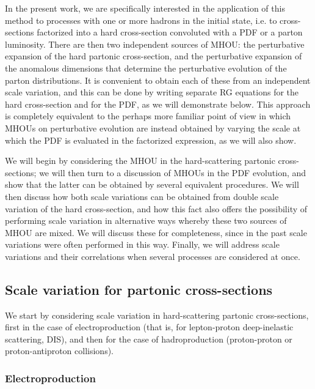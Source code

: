 In the present work, we are specifically interested in the application of this
method to processes
with one or more hadrons in the initial state, i.e. to
cross-sections factorized into a  hard
cross-section convoluted with a PDF or a parton luminosity.
%
There are then two independent sources of MHOU: the perturbative
expansion of the hard partonic cross-section, and the perturbative expansion of
the anomalous dimensions that determine the perturbative evolution of the
parton distributions.
%
It is convenient to obtain each of these from an independent scale
variation, and this can be done by writing separate RG
equations for the hard cross-section and for the PDF, as we will
demonstrate below.
%
This approach is completely equivalent to the perhaps more familiar point
of view in which MHOUs on perturbative evolution are instead obtained
by varying the scale at which the PDF is evaluated in the factorized
expression, as we will also show.

We will begin
by considering the MHOU in the hard-scattering
partonic cross-sections; we will then turn to a discussion of
MHOUs in the PDF evolution, and show that the latter can be obtained
by several equivalent procedures.
%
We will then discuss how both scale variations can be obtained
from double scale variation of the hard cross-section, and how this
fact also offers the possibility of performing scale variation in
alternative ways whereby these two sources of MHOU are mixed.
We will discuss these for completeness, since in the past scale 
variations were often performed in this way.
%
Finally, we will address scale
variations and their correlations when several processes are considered at once.

\subsection{Scale variation for partonic cross-sections}
\label{hard_xsec_sec}

We start by considering scale variation in hard-scattering
partonic cross-sections, first in the case of electroproduction
(that is, for lepton-proton deep-inelastic scattering, DIS), and then for the case of
hadroproduction (proton-proton or proton-antiproton collisions).

\subsubsection{Electroproduction}

